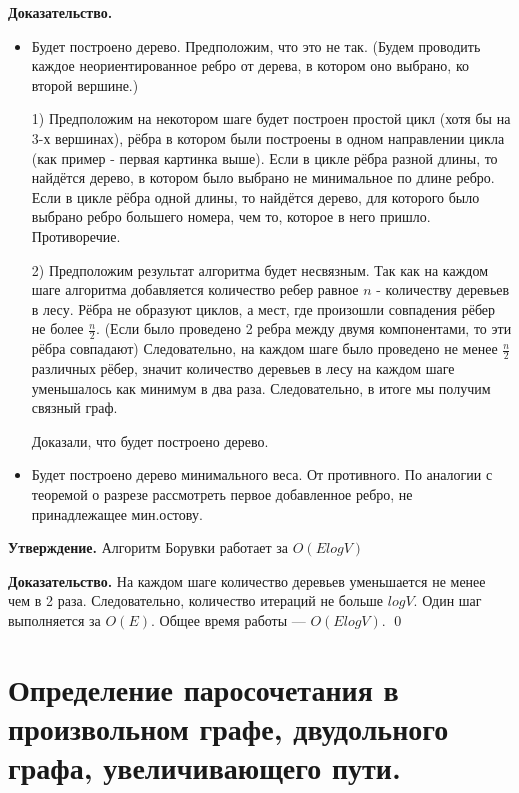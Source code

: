     \textbf{Доказательство.}
    
    \parbox[t]{0.95\linewidth}{
        \begin{itemize}
            \item Будет построено дерево. Предположим, что это не так. (Будем проводить каждое неориентированное ребро от дерева, в котором оно выбрано, ко второй вершине.) 
            
            1) Предположим на некотором шаге будет построен простой цикл (хотя бы на 3-х вершинах), рёбра в котором были построены в одном направлении цикла (как пример - первая картинка выше). Если в цикле рёбра разной длины, то найдётся дерево, в котором было выбрано не минимальное по длине ребро. Если в цикле рёбра одной длины, то найдётся дерево, для которого было выбрано ребро большего номера, чем то, которое в него пришло. Противоречие. 
            
            2) Предположим результат алгоритма будет несвязным. Так как на каждом шаге алгоритма добавляется количество ребер равное $n$ - количеству деревьев в лесу. Рёбра не образуют циклов, а мест, где произошли совпадения рёбер не более $\frac{n}{2}$. (Если было проведено 2 ребра между двумя компонентами, то эти рёбра совпадают) Следовательно, на каждом шаге было проведено не менее $\frac{n}{2}$ различных рёбер, значит количество деревьев в лесу на каждом шаге уменьшалось как минимум в два раза. Следовательно, в итоге мы получим связный граф.
            
            Доказали, что будет построено дерево.
            
            \item Будет построено дерево минимального веса. От противного. По аналогии с теоремой о разрезе рассмотреть первое добавленное ребро, не принадлежащее мин.остову.
        \end{itemize}
    }
    
    \textbf{Утверждение.} Алгоритм Борувки работает за $O(E log V)$
    
    \textbf{Доказательство.} На каждом шаге количество деревьев уменьшается не менее чем в 2 раза. Следовательно, количество итераций не больше $log V$. Один шаг выполняется за $O(E)$. Общее время работы ---  $O(E log V)$. \qed

\setcounter{section}{63}
\section{Определение паросочетания в произвольном графе, двудольного графа, увеличивающего пути.}

